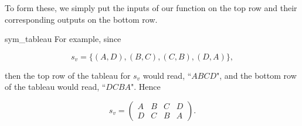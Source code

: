 To form these, we simply put the inputs of our function on the top row and their corresponding outputs on the bottom row.  

\begin{example}{sym_tableau}
For example, since 

\[ s_v = \{(A, D), (B,C), (C, B), (D, A) \}, \]

\noindent
then the top row of the tableau for $s_v$ would read, ``$A  B  C  D$", and the bottom row of the tableau would read, ``$D  C  B  A$".  Hence  

\[ s_v = \begin{pmatrix} A & B & C & D \\ D & C & B & A \end{pmatrix}. \]
\end{example}


